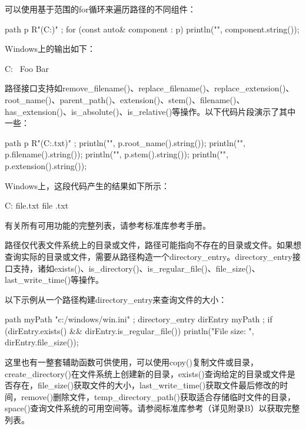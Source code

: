 可以使用基于范围的for循环来遍历路径的不同组件：

\begin{cpp}
path p { R"(C:\Foo\Bar)" };
for (const auto& component : p) {
    println("{}", component.string());
}
\end{cpp}

Windows上的输出如下：

\begin{cpp}
C:
\
Foo
Bar
\end{cpp}

路径接口支持如remove\_filename()、replace\_filename()、replace\_extension()、root\_name()、parent\_path()、extension()、stem()、filename()、has\_extension()、is\_absolute()、is\_relative()等操作。以下代码片段演示了其中一些：

\begin{cpp}
path p { R"(C:\Foo\Bar\file.txt)" };
println("{}", p.root_name().string());
println("{}", p.filename().string());
println("{}", p.stem().string());
println("{}", p.extension().string());
\end{cpp}

Windows上，这段代码产生的结果如下所示：

\begin{shell}
C:
file.txt
file
.txt
\end{shell}

有关所有可用功能的完整列表，请参考标准库参考手册。

\mySubsubsection{13.6.2}{目录}

路径仅代表文件系统上的目录或文件，路径可能指向不存在的目录或文件。如果想查询实际的目录或文件，需要从路径构造一个directory\_entry。directory\_entry接口支持，诸如exists()、is\_directory()、is\_regular\_file()、file\_size()、last\_write\_time()等操作。

以下示例从一个路径构建directory\_entry来查询文件的大小：

\begin{cpp}
path myPath { "c:/windows/win.ini" };
directory_entry dirEntry { myPath };
if (dirEntry.exists() && dirEntry.is_regular_file()) {
    println("File size: {}", dirEntry.file_size());
}
\end{cpp}


这里也有一整套辅助函数可供使用，可以使用copy()复制文件或目录，create\_directory()在文件系统上创建新的目录，exists()查询给定的目录或文件是否存在，file\_size()获取文件的大小，last\_write\_time()获取文件最后修改的时间，remove()删除文件，temp\_directory\_path()获取适合存储临时文件的目录，space()查询文件系统的可用空间等。请参阅标准库参考（详见附录B）以获取完整列表。

